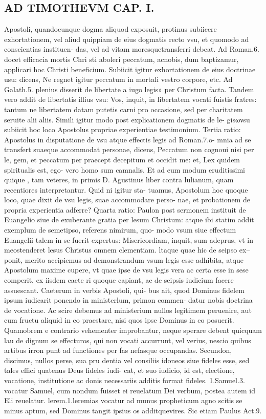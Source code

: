 \documentclass{article}
\begin{document}
\begin{pages}
\section*{AD TIMOTHEVM CAP. I. }
\marginpar{[ p.32 ]}\pstart Apostoli, quandocunque  dogma aliquod exposuit, protinus subiicere exhortationem, vel aliud quippiam de eius dogmatis recto vsu, et quomodo ad conscientias instituen- das, vel ad vitam moresquetransferri debeat. Ad Roman.6. docet efficacia mortis Chri sti aboleri peccatum, acnobis, dum baptizamur, applicari hoc Christi beneficium. Subiicit igitur exhortationem de eius doctrinae usu: dicens, Ne regnet igitur peccatum in mortali vestro corpore, etc. Ad Galath.5. plenius disserit de libertate a iugo legis» per Christum facta. Tandem vero addit de libertatis illius vsu: Vos, inquit, in libertatem vocati fuistis fratres: tantum ne libertatem datam putetis carni pro occasione, sed per charitatem seruite alii aliis. Simili igitur modo post explicationem dogmatis de le- gisωνsu subiicit hoc loco Apostolus propriae experientiae testimonium.  \pend\pstart Tertia ratio: Apostolus in disputatione de vsu atque effectis legis ad Roman.7.o- mnia ad se transfert suaeque  accommodat personae, dicens, Peccatum non cognoui nisi per le, gem, et peccatum per praecept decepitum et occidit me: et, Lex quidem spiritualis est, ego- vero homo sum camnalis. Et ad eum modum eruditissimi quique , tam veteres, in primis D. Agustinus liber  contra lulianum, quam recentiores interpretantur. Quid ni igitur sta- tuamus, Apostolum hoc quoque  loco, quae dixit de vsu legis, suae accommodare perso- nae, et probationem de propria experientia adferre?  \pend\pstart Quarta ratio: Paulon post sermonem instituit de Euangelio siue de exuberante gratia per lesum Christum: atque  ibi statim addit exemplum de semetipso, referens nimirum, quo- modo vsum siue effectum Euangelii talem in se fuerit expertus: Misericordiam, inquit, sum adeprus, vt in meostenderet lesus Christus omnem clementiam. ltaque  quae hic de seipso ex-- ponit, merito accipiemus ad demonstrandum vsum legis esse adhibita, atque  Apostolum maxime cupere, vt quae ipse de vsu legis vera ac certa esse in sese comperit, ex iisdem caete ri quoque  capiant, ac de seipsis iudicium facere assuescant. Caeterum in verbis Apostoli, qui- bus ait, quod Dominus fidelem ipsum iudicarit ponendo in ministerlum, primon commen- datur nobis doctrina de vocatione. Ac scire debemus ad ministerium nullos legitimem peruenire, aut cum fructu aliquid in eo praestare, nisi quos ipse Dominus in eo posuerit. Quamobrem e contrario vehementer improbantur, neque  sperare debent quicquam lau de dignum se effecturos, qui non vocati accurrunt, vel verius, nescio quibus artibus irron punt ad functiones per fas nefasque  occupandas. Secundon, discimus, nullos perse, sua pru dentia vel consiliis idoneos siue fideles esse, sed tales effici quatenus Deus fideles iudi- cat, et suo iudicio, id est, electione, vocatione, institutione ac donis necessariis additis format fideles. 1.Samuel.3. vocatur Samuel, cum nondum fuisset ei reuelatum Dei verbum, postea autem id Eli reuelatur. lerem.1.leremias vocatur ad munus propheticum agno scitis se minus aptum, sed Dominus tangit ipsius os additquevires. Sic etiam Paulus Act.9. 
\end{pages}
\end{document}
